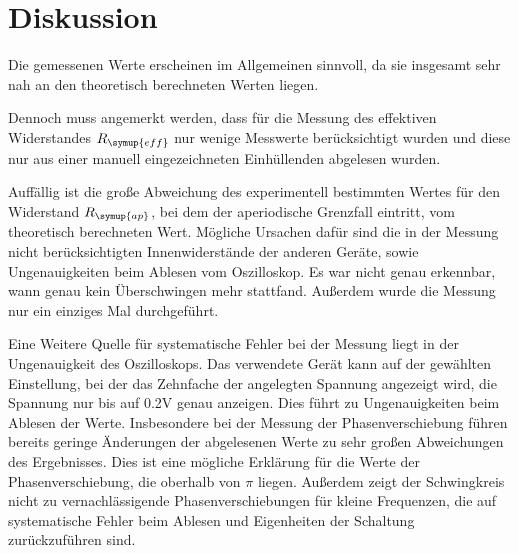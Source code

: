 \section{Diskussion}
\label{sec:Diskussion}
Die gemessenen Werte erscheinen im Allgemeinen sinnvoll, da sie insgesamt
sehr nah an den theoretisch berechneten Werten liegen.

Dennoch muss angemerkt werden, dass für die Messung des effektiven Widerstandes $R_{\symup{eff}}$
nur wenige Messwerte berücksichtigt wurden und diese nur aus einer manuell eingezeichneten
Einhüllenden abgelesen wurden.

Auffällig ist die große Abweichung des experimentell bestimmten Wertes für den
Widerstand $R_{\symup{ap}}$, bei dem der aperiodische Grenzfall eintritt, vom theoretisch
berechneten Wert. Mögliche Ursachen dafür sind die in der Messung nicht berücksichtigten
Innenwiderstände der anderen Geräte, sowie Ungenauigkeiten beim Ablesen vom Oszilloskop.
Es war nicht genau erkennbar, wann genau kein Überschwingen mehr stattfand. Außerdem
wurde die Messung nur ein einziges Mal durchgeführt.

Eine Weitere Quelle für systematische Fehler bei der Messung liegt in der Ungenauigkeit
des Oszilloskops. Das verwendete Gerät kann auf der gewählten Einstellung, bei der
das Zehnfache der angelegten Spannung angezeigt wird, die Spannung nur bis auf 0.2V genau
anzeigen. Dies führt zu Ungenauigkeiten beim Ablesen der Werte. Insbesondere
bei der Messung der Phasenverschiebung führen bereits geringe Änderungen der abgelesenen
Werte zu sehr großen Abweichungen des Ergebnisses. Dies ist eine mögliche Erklärung
für die Werte der Phasenverschiebung, die oberhalb von $\pi$ liegen. Außerdem zeigt
der Schwingkreis nicht zu vernachlässigende Phasenverschiebungen für kleine Frequenzen,
die auf systematische Fehler beim Ablesen und Eigenheiten der Schaltung zurückzuführen sind.
